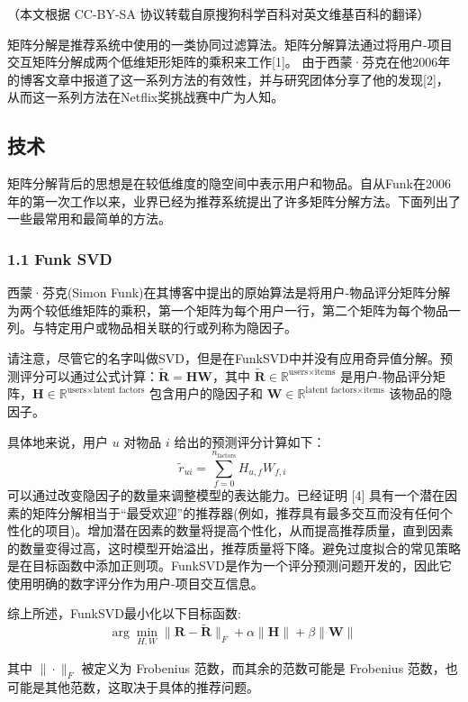 
（本文根据 CC-BY-SA 协议转载自原搜狗科学百科对英文维基百科的翻译）

矩阵分解是推荐系统中使用的一类协同过滤算法。矩阵分解算法通过将用户-项目交互矩阵分解成两个低维矩形矩阵的乘积来工作[1]。 由于西蒙·芬克在他2006年的博客文章中报道了这一系列方法的有效性，并与研究团体分享了他的发现[2]，从而这一系列方法在Netflix奖挑战赛中广为人知。

\subsection{技术}
矩阵分解背后的思想是在较低维度的隐空间中表示用户和物品。自从Funk在2006年的第一次工作以来，业界已经为推荐系统提出了许多矩阵分解方法。下面列出了一些最常用和最简单的方法。
\subsubsection{1.1 Funk SVD}
西蒙·芬克(Simon Funk)在其博客中提出的原始算法是将用户-物品评分矩阵分解为两个较低维矩阵的乘积，第一个矩阵为每个用户一行，第二个矩阵为每个物品一列。与特定用户或物品相关联的行或列称为隐因子。

请注意，尽管它的名字叫做SVD，但是在FunkSVD中并没有应用奇异值分解。预测评分可以通过公式计算：$\tilde{\mathbf{R}} = \mathbf{H} \mathbf{W}$，其中 $\tilde{\mathbf{R}} \in \mathbb{R}^{\text{users} \times \text{items}}$ 是用户-物品评分矩阵，$\mathbf{H} \in \mathbb{R}^{\text{users} \times \text{latent factors}}$ 包含用户的隐因子和 $\mathbf{W} \in \mathbb{R}^{\text{latent factors} \times \text{items}}$ 该物品的隐因子。

具体地来说，用户 $u$ 对物品 $i$ 给出的预测评分计算如下：
$$\tilde{r}_{ui} = \sum_{f=0}^{n_{\text{factors}}} H_{u,f} W_{f,i}~$$
可以通过改变隐因子的数量来调整模型的表达能力。已经证明 [4] 具有一个潜在因素的矩阵分解相当于“最受欢迎”的推荐器(例如，推荐具有最多交互而没有任何个性化的项目)。增加潜在因素的数量将提高个性化，从而提高推荐质量，直到因素的数量变得过高，这时模型开始溢出，推荐质量将下降。避免过度拟合的常见策略是在目标函数中添加正则项。FunkSVD是作为一个评分预测问题开发的，因此它使用明确的数字评分作为用户-项目交互信息。

综上所述，FunkSVD最小化以下目标函数:
\begin{equation}
\arg \min_{H, W} \|\mathbf{R} - \tilde{\mathbf{R}}\|_F + \alpha \|\mathbf{H}\| + \beta \|\mathbf{W}\|~
\end{equation}

其中 \(\|\cdot\|_F\) 被定义为 Frobenius 范数，而其余的范数可能是 Frobenius 范数，也可能是其他范数，这取决于具体的推荐问题。
